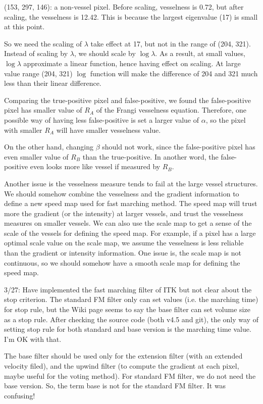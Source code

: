 \documentclass[12pt]{article}
\begin{document}
(153, 297, 146): a non-vessel pixel. Before scaling, vesselness is 0.72, but
after scaling, the vesselness is 12.42. This is because the largest eigenvalue (17)
is small at this point. 

So we need the scaling of $\lambda$ take effect at 17, but not in the range of
(204, 321). Instead of scaling by $\lambda$, we should scale by $\log
\lambda$. As a result, at small values, $\log \lambda$ approximate a linear
function, hence having effect on scaling. At large value range (204, 321)
$\log$ function will make the difference of 204 and 321 much less than their
linear difference.

Comparing the true-positive pixel and false-positive, we found the
false-positive pixel has smaller value of $R_A$ of the Frangi vesselness
equation. Therefore, one possible way of having less false-positive is set a
larger value of $\alpha$, so the pixel with smaller $R_A$ will have smaller
vesselness value.

On the other hand, changing $\beta$ should not work, since the false-positive
pixel has even smaller value of $R_B$ than the true-positive. In another word,
the false-positive even looks more like vessel if measured by $R_B$.

Another issue is the vesselness measure tends to fail at the large vessel
structures. We should somehow combine the vesselness and the gradient
information to define a new speed map used for fast marching method. The speed
map will trust more the gradient (or the intensity) at larger vessels, and
trust the vesselness measures on smaller vessels. We can also use the scale
map to get a sense of the scale of the vessels for defining the speed map. For
example, if a pixel has a large optimal scale value on the scale map, we
assume the vesselness is less reliable than the gradient or intensity
information. One issue is, the scale map is not continuous, so we should
somehow have a smooth scale map for defining the speed map.

3/27: Have implemented the fast marching filter of ITK but not clear about the
stop criterion. The standard FM filter only can set values (i.e. the marching
time) for stop rule, but the Wiki page seems to say the base filter can set
volume size as a stop rule. After checking the source code (both v4.5 and
git), the only way of setting stop rule for both standard and base version is
the marching time value. I'm OK with that.

The base filter should be used only for the extension filter (with an extended
velocity filed), and the upwind filter (to compute the gradient at each pixel,
maybe useful for the voting method). For standard FM filter, we do not need
the base version. So, the term base is not for the standard FM filter. It was
confusing!
\end{document}
